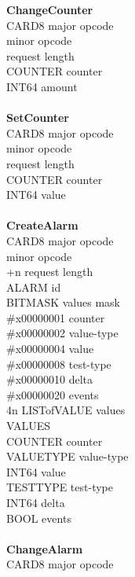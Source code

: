 \begin{tabbing}
\tabstopsC
{\bf ChangeCounter}\\
		\> CARD8	\> major opcode \\
				\> minor opcode\footnotemark[1] \\
				\> request length \\
		\> COUNTER	\> counter \\
		\> INT64	\> amount \\
\\
{\bf SetCounter}\\
		\> CARD8	\> major opcode \\
				\> minor opcode\footnotemark[1] \\
				\> request length \\
		\> COUNTER	\> counter \\
		\> INT64	\> value \\
\\
{\bf CreateAlarm}\\
		\> CARD8	\> major opcode \\
				\> minor opcode \\
		+n		\> request length \\
		\> ALARM	\> id \\
		\> BITMASK	\> values mask\\
\tabstopsB
	\>	\> \#x00000001	\> counter \\
	\>	\> \#x00000002	\> value-type \\
	\>	\> \#x00000004	\> value \\
	\>	\> \#x00000008	\> test-type \\
	\>	\> \#x00000010	\> delta \\
	\>	\>  \#x00000020	\> events \\
\tabstopsC
	\> 4n	\> LISTofVALUE	\> values\\
\tabstopsB
VALUES\\
		\> COUNTER	\> counter\\
		\> VALUETYPE	\> value-type \\
		\> INT64	\> value \\
		\> TESTTYPE	\> test-type \\
		\> INT64	\> delta \\
		\> BOOL		\> events\\
\tabstopsC
\\
{\bf ChangeAlarm}\\
		\> CARD8	\> major opcode \\

\end{tabbing}
